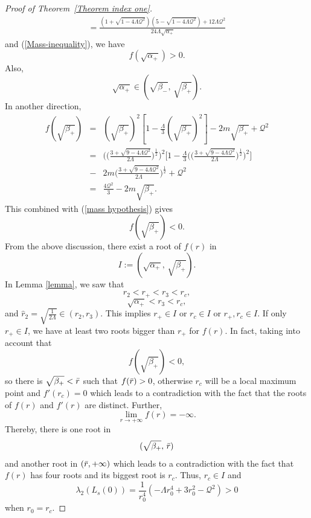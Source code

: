 \documentclass[a4paper, 11pt, reqno]{amsart}
\begin{document}
\begin{proof}[Proof of Theorem~\ref{Theorem index one}]
\begin{eqnarray}
  =  \frac{(1+\sqrt{1-4\Lambda\mathcal{Q}^2})(5-\sqrt{1-4\Lambda\mathcal{Q}^2})+12\Lambda\mathcal{Q}^2}{24\Lambda \sqrt{\alpha_{+}}}
 \end{eqnarray}
and (\ref{Mass-inequality}), we have
$$f(\sqrt{\alpha_{+}})>0.$$
Also,
 \begin{equation*}
       \sqrt{\alpha_{+}}\in(\sqrt{\beta_{-}},\,\sqrt{\beta_{+}}).
    \end{equation*}
    In another direction,
   \begin{eqnarray*}
f(\sqrt{\beta_{+}})&=&(\sqrt{\beta_{+}})^2[1-\frac{\Lambda}{3}(\sqrt{\beta_{+}})^2]-2m\sqrt{\beta_{+}}+\mathcal{Q}^2\\
&=&\Big(\Big(\frac{3+\sqrt{9-4\Lambda\mathcal{Q}^2}}{2\Lambda}\Big)^{\frac{1}{2}}\Big)^2\Big[1-\frac{\Lambda}{3}\Big(\Big(\frac{3+\sqrt{9-4\Lambda\mathcal{Q}^2}}{2\Lambda}\Big)^{\frac{1}{2}}\Big)^2\Big]\\
&-&2m\Big(\frac{3+\sqrt{9-4\Lambda\mathcal{Q}^2}}{2\Lambda}\Big)^{\frac{1}{2}}+\mathcal{Q}^2\\
&=&\frac{4\mathcal{Q}^2}{3}-2m\sqrt{\beta_{+}}.
\end{eqnarray*}
This combined with (\ref{mass hypothesis}) gives
    \begin{equation*}
        f(\sqrt{\beta_{+}})<0.
    \end{equation*}
     From the above discussion, there exist a root of $f(r)$ in
     \begin{equation*}
         I:=(\sqrt{\alpha_{+}},\,\sqrt{\beta_{+}}).
     \end{equation*}
     In Lemma \ref{lemma}, we saw that
     $$r_2<r_+<r_3<r_c,$$
     $$\sqrt{\alpha_{+}}<r_3<r_c,$$
     and $\hat{r}_2=\sqrt{\frac{1}{2\Lambda}}\in (r_2,r_3)$. This implies $r_+\in I$ or $r_c\in I$ or $r_+,r_c\in I$. If only $r_+\in I$, we have at least two roots bigger than $r_+$ for $f(r)$. In fact, taking into account that
$$f(\sqrt{\beta_{+}})<0,$$ 
so there is $\sqrt{\beta_{+}}<\Bar{r}$ such that $f(\Bar{r})>0$, otherwise $r_c$ will be a local maximum point and $f'(r_c)=0$ which leads to a contradiction with the fact that the roots of $f(r)$ and $f'(r)$ are distinct. Further,
$$\lim\limits_{r \to {+\infty}}f(r)=-\infty.$$
Thereby, there is one root in
$$(\sqrt{\beta_{+}},\,\Bar{r})$$
and another root in $(\Bar{r},+\infty)$ which leads to a contradiction with the fact that $f(r)$ has four roots and its biggest root is $r_c$. Thus, $r_c\in I$ and
$$\lambda_2(L_s(0))=\frac{1}{r_0^4}(-\Lambda r_0^4+3r_0^2-\mathcal{Q}^2)>0$$
when $r_0=r_c$. 


\end{proof}
\end{document}
